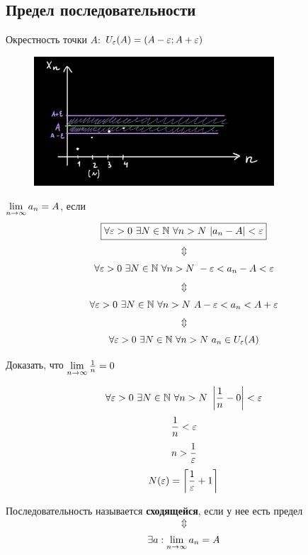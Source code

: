 \subsection{Предел последовательности}

\begin{definition}
    Окрестность точки $A$: $U_{\varepsilon}(A) = (A - \varepsilon; A + \varepsilon)$
\end{definition}

\begin{figure}[h]
  \centering
  \includegraphics[width=0.8\textwidth]{lectures/files/lec_3_19.09.2025-13-56-05.png}
  \label{fig:lec_3_19.09.2025-13-56-05.png}
\end{figure}

\begin{definition}
    $\lim\limits_{n \to \infty} a_n = A$, если 
    $$\fbox{$ \forall \varepsilon > 0\ \exists N \in \mathbb{N}\ \forall n > N\ |a_n - A| < \varepsilon $}$$
    $$ \Updownarrow $$
    $$ \forall \eps > 0\ \exists N \in \N\ \forall n > N\ -\eps < a_n - A < \eps $$
    $$ \Updownarrow $$
    $$ \forall \eps > 0\ \exists N \in \N\ \forall n > N\ A-\eps < a_n < A+\eps $$
    $$ \Updownarrow $$
    $$ \forall \eps > 0\ \exists N \in \N\ \forall n > N\ a_n \in U_\eps(A) $$
\end{definition}

\begin{example}
    Доказать, что
    $ \lim\limits_{n \to \infty} \frac{1}{n} = 0 $

    $$ \forall \eps > 0\ \exists N \in \N\ \forall n > N\ \l|\frac{1}{n} - 0\r| < \eps $$
    $$ \frac{1}{n} < \varepsilon $$
    $$ n > \frac{1}{\varepsilon} $$
    $$ N(\varepsilon) = \left\lceil \frac{1}{\varepsilon} + 1 \right\rceil $$
\end{example}

\begin{definition}
    Последовательность называется \textbf{сходящейся}, если у нее есть предел 
    $$ \Updownarrow $$
    $$ \exists a : \lim\limits_{n \to \infty} a_n = A $$
\end{definition}

